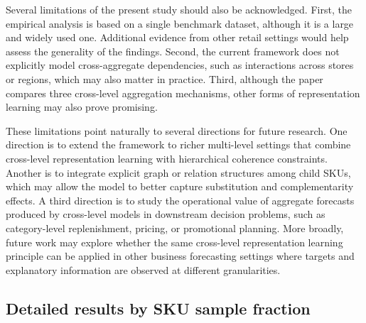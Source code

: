 \documentclass[12pt]{article}
\begin{document}
Several limitations of the present study should also be acknowledged. First, the empirical analysis is based on a single benchmark dataset, although it is a large and widely used one. Additional evidence from other retail settings would help assess the generality of the findings. Second, the current framework does not explicitly model cross-aggregate dependencies, such as interactions across stores or regions, which may also matter in practice. Third, although the paper compares three cross-level aggregation mechanisms, other forms of representation learning may also prove promising.

These limitations point naturally to several directions for future research. One direction is to extend the framework to richer multi-level settings that combine cross-level representation learning with hierarchical coherence constraints. Another is to integrate explicit graph or relation structures among child SKUs, which may allow the model to better capture substitution and complementarity effects. A third direction is to study the operational value of aggregate forecasts produced by cross-level models in downstream decision problems, such as category-level replenishment, pricing, or promotional planning. More broadly, future work may explore whether the same cross-level representation learning principle can be applied in other business forecasting settings where targets and explanatory information are observed at different granularities.

\printbibliography

\clearpage
\subsection{Detailed results by SKU sample fraction}
\end{document}
